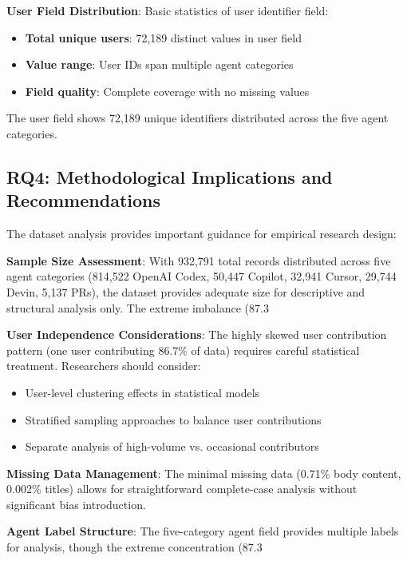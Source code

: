 \documentclass[conference]{IEEEtran}
\begin{document}
\textbf{User Field Distribution}: Basic statistics of user identifier field:
\begin{itemize}
    \item \textbf{Total unique users}: 72,189 distinct values in user field
    \item \textbf{Value range}: User IDs span multiple agent categories
    \item \textbf{Field quality}: Complete coverage with no missing values
\end{itemize}

The user field shows 72,189 unique identifiers distributed across the five agent categories.

\subsection{RQ4: Methodological Implications and Recommendations}

The dataset analysis provides important guidance for empirical research design:

\textbf{Sample Size Assessment}: With 932,791 total records distributed across five agent categories (814,522 OpenAI Codex, 50,447 Copilot, 32,941 Cursor, 29,744 Devin, 5,137 PRs), the dataset provides adequate size for descriptive and structural analysis only. The extreme imbalance (87.3%

\textbf{User Independence Considerations}: The highly skewed user contribution pattern (one user contributing 86.7\% of data) requires careful statistical treatment. Researchers should consider:
\begin{itemize}
    \item User-level clustering effects in statistical models
    \item Stratified sampling approaches to balance user contributions  
    \item Separate analysis of high-volume vs. occasional contributors
\end{itemize}

\textbf{Missing Data Management}: The minimal missing data (0.71\% body content, 0.002\% titles) allows for straightforward complete-case analysis without significant bias introduction.

\textbf{Agent Label Structure}: The five-category agent field provides multiple labels for analysis, though the extreme concentration (87.3%
\end{document}
